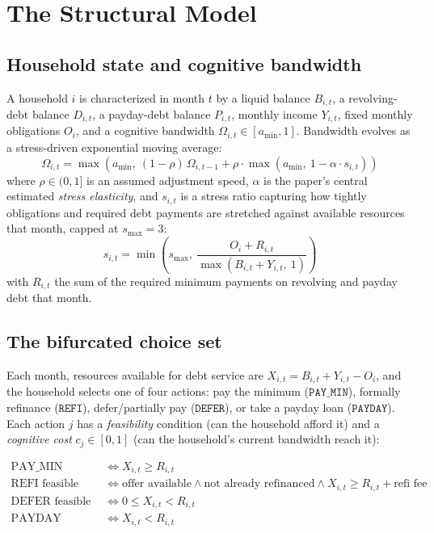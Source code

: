 \documentclass[12pt]{article}
\begin{document}
\section{The Structural Model}

\subsection{Household state and cognitive bandwidth}

A household $i$ is characterized in month $t$ by a liquid balance $B_{i,t}$, a revolving-debt balance $D_{i,t}$, a payday-debt balance $P_{i,t}$, monthly income $Y_{i,t}$, fixed monthly obligations $O_i$, and a cognitive bandwidth $\Omega_{i,t} \in [a_{\min}, 1]$. Bandwidth evolves as a stress-driven exponential moving average:
\begin{equation}
    \Omega_{i,t} = \max\left(a_{\min},\ (1-\rho)\,\Omega_{i,t-1} + \rho \cdot \max\!\left(a_{\min},\ 1 - \alpha \cdot s_{i,t}\right)\right)
\end{equation}
where $\rho \in (0,1]$ is an assumed adjustment speed, $\alpha$ is the paper's central estimated \emph{stress elasticity}, and $s_{i,t}$ is a stress ratio capturing how tightly obligations and required debt payments are stretched against available resources that month, capped at $s_{\max}=3$:
\begin{equation}
    s_{i,t} = \min\left(s_{\max},\ \frac{O_i + R_{i,t}}{\max(B_{i,t} + Y_{i,t},\ 1)}\right)
\end{equation}
with $R_{i,t}$ the sum of the required minimum payments on revolving and payday debt that month.

\subsection{The bifurcated choice set}

Each month, resources available for debt service are $X_{i,t} = B_{i,t} + Y_{i,t} - O_i$, and the household selects one of four actions: pay the minimum ($\texttt{PAY\_MIN}$), formally refinance ($\texttt{REFI}$), defer/partially pay ($\texttt{DEFER}$), or take a payday loan ($\texttt{PAYDAY}$). Each action $j$ has a \emph{feasibility} condition (can the household afford it) and a \emph{cognitive cost} $c_j \in [0,1]$ (can the household's current bandwidth reach it):

\begin{align}
    \text{PAY\_MIN feasible} &\iff X_{i,t} \ge R_{i,t} \\
    \text{REFI feasible} &\iff \text{offer available} \wedge \text{not already refinanced} \wedge X_{i,t} \ge R_{i,t} + \text{refi fee} \\
    \text{DEFER feasible} &\iff 0 \le X_{i,t} < R_{i,t} \\
    \text{PAYDAY feasible} &\iff X_{i,t} < R_{i,t}
\end{align}
\end{document}
